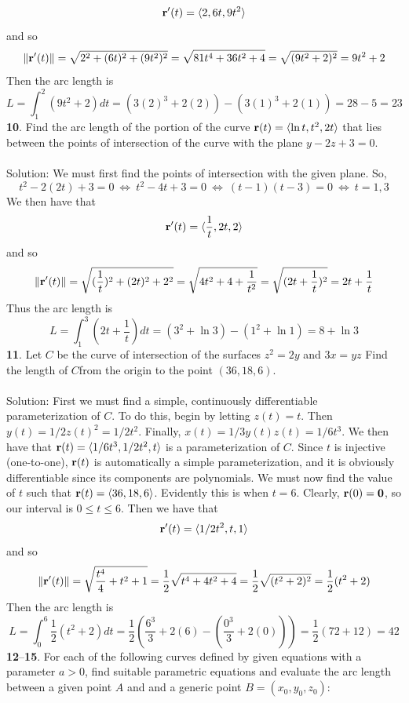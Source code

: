 \documentclass[12pt]{amsbook}
\newcommand{\la}{\langle}
\newcommand{\ra}{\rangle}
\begin{document}
$${\bf r}'(t)=\la 2, 6t, 9t^2 \ra$$
and so
$$\|{\bf r}'(t)\|=\sqrt{2^2+(6t)^2+(9t^2)^2}=\sqrt{81t^4+36t^2+4}=\sqrt{(9t^2+2)^2}=9t^2+2$$
Then the arc length is
$$L=\int_1^2 (9t^2+2)dt=(3(2)^3+2(2))-(3(1)^3+2(1))=28-5=23$$
{\small\bf 10}. Find the arc length of the portion of the curve ${\bf r}(t)=\la \ln t, t^2, 2t \ra$ that lies between the points of intersection of the curve with the plane $y-2z+3=0$. 
\\
\\
{\sc Solution}: We must first find the points of intersection with the given plane. So,
$$t^2-2(2t)+3=0 \ \Leftrightarrow \ t^2-4t+3=0 \ \Leftrightarrow \ (t-1)(t-3)=0 \ \Leftrightarrow \ t=1,3$$ 
We then have that 
$${\bf r}'(t)=\la \frac{1}{t}, 2t, 2 \ra$$
and so
$$\|{\bf r}'(t)\|=\sqrt{(\frac{1}{t})^2+(2t)^2+2^2}=\sqrt{4t^2+4+\frac{1}{t^2}}=\sqrt{(2t+\frac{1}{t})^2}=2t+\frac{1}{t}$$
Thus the arc length is
$$L=\int_1^3(2t+\frac{1}{t})dt=(3^2+\ln 3)-(1^2+\ln 1)=8+\ln 3$$
{\small\bf 11}. Let $C$ be the curve of intersection of the surfaces $z^2=2y$ and $3x=yz$ Find the length of $C $from the origin to the point $(36, 18, 6)$.
\\
\\
{\sc Solution}: First we must find a simple, continuously differentiable parameterization of $C$. To do this, begin by letting $z(t)=t$. Then $y(t)=1/2z(t)^2=1/2t^2$. Finally, $x(t)=1/3y(t)z(t)=1/6t^3$. We then have that ${\bf r}(t)=\la 1/6t^3, 1/2t^2, t \ra$ is a parameterization of $C$. Since $t$ is injective (one-to-one), ${\bf r}(t)$ is automatically a simple parameterization, and it is obviously differentiable since its components are polynomials. We must now find the value of $t$ such that ${\bf r}(t)=\la 36,18,6 \ra$. Evidently this is when $t=6$. Clearly, ${\bf r}(0)={\bf 0}$, so our interval is $0 \leq t \leq 6$. Then we have that
$${\bf r}'(t)=\la 1/2t^2, t, 1 \ra$$
and so 
$$\|{\bf r}'(t)\| = \sqrt{\frac{t^4}{4}+t^2+1}=\frac{1}{2}\sqrt{t^4+4t^2+4}=\frac{1}{2}\sqrt{(t^2+2)^2}=\frac{1}{2}(t^2+2)$$
Then the arc length is
$$L=\int_0^6 \frac{1}{2}(t^2+2)dt = \frac{1}{2}(\frac{6^3}{3}+2(6)-(\frac{0^3}{3}+2(0)))=\frac{1}{2}(72+12)=42$$
\noindent
{\small {\bf 12}--{\bf 15}}. For each of the following curves defined by given equations with a
parameter $a > 0$, find suitable parametric equations and evaluate the arc length between a given point $A$ and and a generic point $B = (x_0, y_0, z_0)$:
\end{document}

